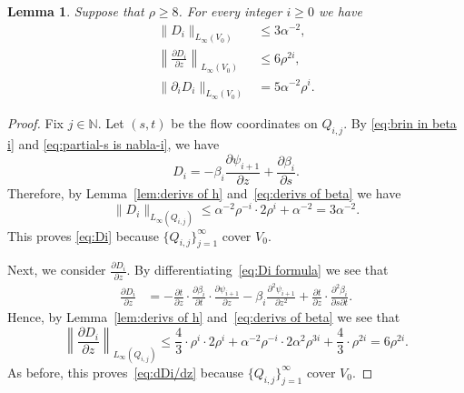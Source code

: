 \documentclass[11pt,reqno]{amsart}
\newcommand{\N}{\mathbb{N}}
\newcommand{\0}{\mathbf{0}}
\renewcommand{\1}{\mathbf 1}
\renewcommand{\ge}{\geqslant}
\renewcommand{\le}{\leqslant}
\newtheorem{lemma}[thm]{Lemma}
\theoremstyle{remark}
\newcommand{\pd}[2]{\frac{\partial #2}{\partial #1}}
\begin{document}
\begin{lemma}\label{lem:derivs of Di} Suppose that $\rho\ge 8$.
  For every integer $i\ge 0$ we have
  \begin{align}
    \label{eq:Di}
    \|D_i\|_{L_\infty(V_0)} &\le 3\alpha^{-2},\\
    \label{eq:dDi/dz}
    \left\|\frac{\partial D_i}{\partial z}\right\|_{L_\infty(V_0)}&\le 6 \rho^{2i},\\
    \label{eq:nabla Di}
    \|\partial_i D_i\|_{L_\infty(V_0)} &=5\alpha^{-2}\rho^{i}.
  \end{align}
\end{lemma}
\begin{proof}
  Fix $j\in \N$.  Let  $(s,t)$ be the flow coordinates on $Q_{i,j}$.  By \eqref{eq:brin in beta i} and \eqref{eq:partial-s is nabla-i}, we have
  \begin{equation}\label{eq:Di formula}
  D_i=-\beta_i \frac{\partial \psi_{i+1}}{\partial z}+\frac{\partial \beta_i}{\partial s}.
  \end{equation}
 Therefore, by Lemma~\ref{lem:derivs of h} and~\eqref{eq:derivs of beta} we have
  $$\|D_i\|_{L_\infty(Q_{i,j})} \le \alpha^{-2} \rho^{-i} \cdot 2\rho^{i}+\alpha^{-2}= 3\alpha^{-2}.$$
  This proves \eqref{eq:Di} because $\{Q_{i,j}\}_{j=1}^\infty$ cover $V_0$.

  Next, we consider $\pd{z}{D_i}$.  By differentiating~\eqref{eq:Di formula} we see that
  \begin{align*}
    \frac{\partial D_i}{\partial z}
    &=-\frac{\partial t}{\partial z}\cdot \frac{\partial \beta_i}{\partial t}\cdot \frac{\partial \psi_{i+1}}{\partial z}- \beta_i \frac{\partial^2 \psi_{i+1}}{\partial z^2}+\frac{\partial t}{\partial z}\cdot \frac{\partial^2 \beta_i}{\partial s\partial t}.
  \end{align*}
Hence,  by Lemma~\ref{lem:derivs of h} and~\eqref{eq:derivs of beta} we see that
  $$\left\|\frac{\partial D_i}{\partial z}\right\|_{L_\infty(Q_{i,j})} \le \frac{4}{3}\cdot \rho^{i}\cdot 2\rho^i +\alpha^{-2}\rho^{-i}\cdot 2\alpha^2 \rho^{3i} + \frac{4}{3}\cdot\rho^{2i}=6 \rho^{2i}.$$
  As before, this proves~\eqref{eq:dDi/dz} because $\{Q_{i,j}\}_{j=1}^\infty$ cover $V_0$.


\end{proof}
\end{document}

